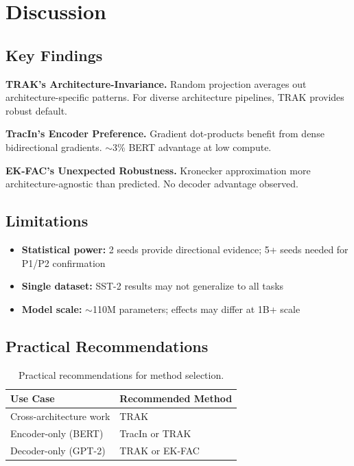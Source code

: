 \section{Discussion}

\subsection{Key Findings}

\textbf{TRAK's Architecture-Invariance.} Random projection averages out architecture-specific patterns. For diverse architecture pipelines, TRAK provides robust default.

\textbf{TracIn's Encoder Preference.} Gradient dot-products benefit from dense bidirectional gradients. $\sim$3\% BERT advantage at low compute.

\textbf{EK-FAC's Unexpected Robustness.} Kronecker approximation more architecture-agnostic than predicted. No decoder advantage observed.

\subsection{Limitations}

\begin{itemize}
    \item \textbf{Statistical power:} 2 seeds provide directional evidence; 5+ seeds needed for P1/P2 confirmation
    \item \textbf{Single dataset:} SST-2 results may not generalize to all tasks
    \item \textbf{Model scale:} $\sim$110M parameters; effects may differ at 1B+ scale
\end{itemize}

\subsection{Practical Recommendations}

\begin{table}[h]
\centering
\begin{tabular}{@{}ll@{}}
\toprule
Use Case & Recommended Method \\
\midrule
Cross-architecture work & TRAK \\
Encoder-only (BERT) & TracIn or TRAK \\
Decoder-only (GPT-2) & TRAK or EK-FAC \\
\bottomrule
\end{tabular}
\caption{Practical recommendations for method selection.}
\label{tab:recommendations}
\end{table}
